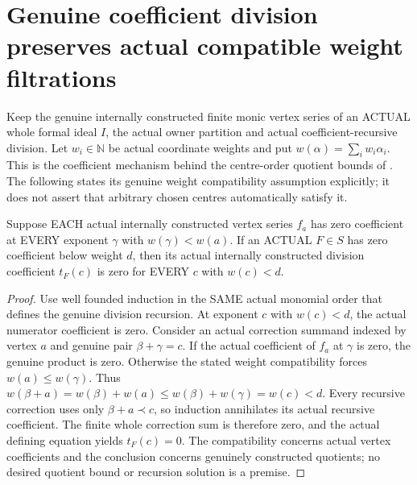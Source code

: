 \section{Genuine coefficient division preserves actual compatible weight filtrations}

Keep the genuine internally constructed finite monic vertex series of an
ACTUAL whole formal ideal $I$, the actual owner partition and actual
coefficient-recursive division. Let $w_i\in\mathbb N$ be actual coordinate
weights and put $w(\alpha)=\sum_i w_i\alpha_i$. This is the coefficient
mechanism behind the centre-order quotient bounds of
\cite[Lemma~7.22, Corollary~7.24, pp.~269--270]{bierstone-milman97-invent-math}.
The following states its genuine weight compatibility assumption explicitly;
it does not assert that arbitrary chosen centres automatically satisfy it.

\begin{lemma}
\label{hir:actual-formal-division-recursive-weight-vanishing}
Suppose EACH actual internally constructed vertex series $f_a$ has zero
coefficient at EVERY exponent $\gamma$ with $w(\gamma)<w(a)$.
If an ACTUAL $F\in S$ has zero coefficient below weight $d$, then
its actual internally constructed division coefficient $t_F(c)$ is zero
for EVERY $c$ with $w(c)<d$.
\leanok
\end{lemma}
\begin{proof}
Use well founded induction in the SAME actual monomial order that defines
the genuine division recursion. At exponent $c$ with $w(c)<d$, the
actual numerator coefficient is zero. Consider an actual correction
summand indexed by vertex $a$ and genuine pair $\beta+\gamma=c$.
If the actual coefficient of $f_a$ at $\gamma$ is zero, the genuine
product is zero. Otherwise the stated weight compatibility forces
$w(a)\le w(\gamma)$. Thus
$w(\beta+a)=w(\beta)+w(a)\le w(\beta)+w(\gamma)=w(c)<d$.
Every recursive correction uses only $\beta+a\prec c$, so induction
annihilates its actual recursive coefficient. The finite whole correction
sum is therefore zero, and the actual defining equation yields
$t_F(c)=0$. The compatibility concerns actual vertex coefficients and
the conclusion concerns genuinely constructed quotients; no desired
quotient bound or recursion solution is a premise.
\end{proof}

